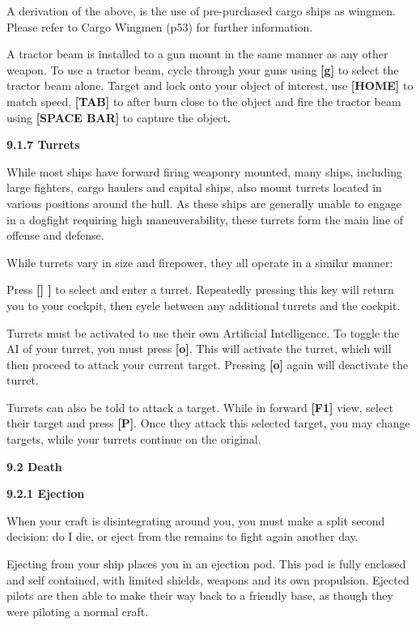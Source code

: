 \documentclass{article}
\begin{document}
A derivation of the above, is the use of pre-purchased cargo ships as wingmen. Please refer to Cargo Wingmen (p53) for further information. 



A tractor beam is installed to a gun mount in the same manner as any other weapon. To use a tractor beam, cycle through your guns using \textbf{[g] }to select the tractor beam alone. Target and lock onto your object of interest, use \textbf{[HOME] }to match speed, \textbf{[TAB] }to after burn close to the object and fire the tractor beam using \textbf{[SPACE BAR]} to capture the object. 



\textbf{9.1.7 Turrets }

While most ships have forward firing weaponry mounted, many ships, including large fighters, cargo haulers and capital ships, also mount turrets located in various positions around the hull. As these ships are generally unable to engage in a dogfight requiring high maneuverability, these turrets form the main line of offense and defense. 

While turrets vary in size and firepower, they all operate in a similar manner: 

Press \textbf{[] ] }to select and enter a turret. Repeatedly pressing this key will return you to your cockpit, then cycle between any additional turrets and the cockpit. 

Turrets must be activated to use their own Artificial Intelligence. To toggle the AI of your turret, you must press \textbf{[o]}. This will activate the turret, which will then proceed to attack your current target. Pressing \textbf{[o] }again will deactivate the turret. 

Turrets can also be told to attack a target. While in forward \textbf{[F1] }view, select their target and press \textbf{[P]}. Once they attack this selected target, you may change targets, while your turrets continue on the original. 

\textbf{}

\textbf{9.2 Death }

\textbf{9.2.1 Ejection }

When your craft is disintegrating around you, you must make a split second decision: do I die, or eject from the remains to fight again another day. 

Ejecting from your ship places you in an ejection pod. This pod is fully enclosed and self contained, with limited shields, weapons and its own propulsion. Ejected pilots are then able to make their way back to a friendly base, as though they were piloting a normal craft. 
\end{document}
